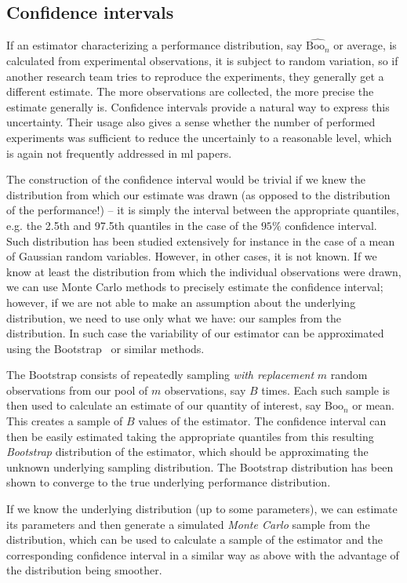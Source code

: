 \documentclass{article}
\newcommand{\ml}{\gls{ml}\xspace}
\newcommand{\boo}[1]{\text{Boo}_{#1}}
\newcommand{\Em}[1]{\boo{#1}}
\newcommand{\emn}{\Em{n}}
\begin{document}
\begin{appendices}
\subsection{Confidence intervals}
\label{app:conf-ints}
If an estimator characterizing a performance distribution, say  $\widehat{\emn}$ or average, is calculated from experimental observations, it is subject to random variation, so if another research team tries to reproduce the experiments, they generally get a different estimate. The more observations are collected, the more precise the estimate generally is. Confidence intervals provide a natural way to express this uncertainty. Their usage also gives a sense whether the number of performed experiments was sufficient to reduce the uncertainly to a reasonable level, which is again not frequently addressed in \ml papers. 

The construction of the confidence interval would be trivial if we knew the distribution from which our estimate was drawn (as opposed to the distribution of the performance!) -- it is simply the interval between the appropriate quantiles, e.g. the 2.5th and 97.5th quantiles in the case of the $95\%$ confidence interval. Such distribution has been studied extensively for instance in the case of a mean of Gaussian random variables. However, in other cases, it is not known. If we know at least the distribution from which the individual observations were drawn, we can use Monte Carlo methods to precisely estimate the confidence interval; however, if we are not able to make an assumption about the underlying distribution, we need to use only what we have: our samples from the distribution. In such case the variability of our estimator can be approximated using the Bootstrap~\citep{efron79} or similar methods. 

The Bootstrap consists of repeatedly sampling \emph{with replacement} $m$ random observations from our pool of $m$ observations, say $B$ times. Each such sample is then used to calculate an estimate of our quantity of interest, say $\emn$ or mean. This creates a sample of $B$ values of the estimator. The confidence interval can then be easily estimated taking the appropriate quantiles from this resulting \emph{Bootstrap} distribution of the estimator, which should be approximating the unknown underlying sampling distribution. The Bootstrap distribution has been shown to converge to the true underlying performance distribution.

If we know the underlying distribution (up to some parameters), we can estimate its parameters and then generate a simulated \emph{Monte Carlo} sample from the distribution, which can be used to calculate a sample of the estimator and the corresponding confidence interval in a similar way as above with the advantage of the distribution being smoother.



\end{appendices}
\end{document}
